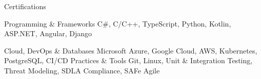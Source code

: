 

\begin{cvskills}

  \cvskill
    {Certifications} %
    {} %

  \cvskill
    {Programming \& Frameworks} %
    {C\#, C/C++, TypeScript, Python, Kotlin, ASP.NET, Angular, Django} %

  \cvskill
    {Cloud, DevOps \& Databases} %
    {Microsoft Azure, Google Cloud, AWS, Kubernetes, PostgreSQL, CI/CD } %
  \cvskill
    {Practices \& Tools} %
    {Git, Linux, Unit \& Integration Testing, Threat Modeling, SDLA Compliance, SAFe Agile} %

\end{cvskills}
